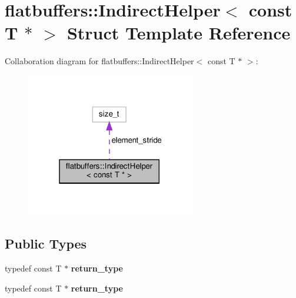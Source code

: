 \hypertarget{structflatbuffers_1_1IndirectHelper_3_01const_01T_01_5_01_4}{}\section{flatbuffers\+:\+:Indirect\+Helper$<$ const T $\ast$ $>$ Struct Template Reference}
\label{structflatbuffers_1_1IndirectHelper_3_01const_01T_01_5_01_4}


Collaboration diagram for flatbuffers\+:\+:Indirect\+Helper$<$ const T $\ast$ $>$\+:
\nopagebreak
\begin{figure}[H]
\begin{center}
\leavevmode
\includegraphics[width=211pt]{structflatbuffers_1_1IndirectHelper_3_01const_01T_01_5_01_4__coll__graph}
\end{center}
\end{figure}
\subsection*{Public Types}
\begin{DoxyCompactItemize}
\item 
\mbox{\label{structflatbuffers_1_1IndirectHelper_3_01const_01T_01_5_01_4_a7f2c3b157027d28bcbfb620791029fe6}} 
typedef const T $\ast$ {\bfseries return\+\_\+type}
\item 
\mbox{\label{structflatbuffers_1_1IndirectHelper_3_01const_01T_01_5_01_4_a7f2c3b157027d28bcbfb620791029fe6}} 
typedef const T $\ast$ {\bfseries return\+\_\+type}
\end{DoxyCompactItemize}
